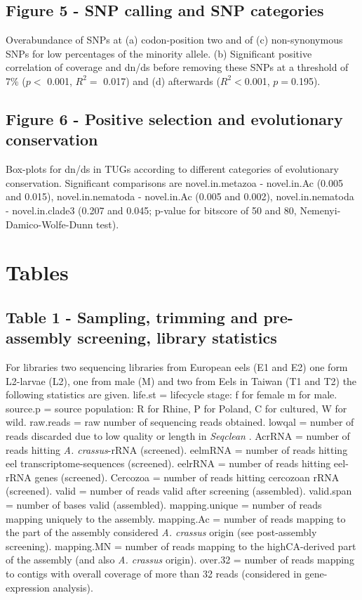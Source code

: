 \documentclass[10pt]{bmc_article}
\newenvironment{bmcformat}{\begin{raggedright}\baselineskip20pt\sloppy\setboolean{publ}{false}}{\end{raggedright}\baselineskip20pt\sloppy}
\begin{document}
\begin{bmcformat}
\subsection*{Figure 5 - SNP calling and SNP categories}
 
Overabundance of SNPs at (a) codon-position two and of (c)
non-synonymous SNPs for low percentages of the minority allele. (b)
Significant positive correlation of coverage and dn/ds before removing
these SNPs at a threshold of 7\% ($p<$ 0.001, $R^2=$
0.017) and (d) afterwards
($R^2<$0.001,
$p=$0.195).


\subsection*{Figure 6 - Positive selection and evolutionary
  conservation}

Box-plots for dn/ds in TUGs according to different categories of
evolutionary conservation. Significant comparisons are
novel.in.metazoa - novel.in.Ac (0.005 and 0.015), novel.in.nematoda -
novel.in.Ac (0.005 and 0.002), novel.in.nematoda - novel.in.clade3
(0.207 and 0.045; p-value for bitscore of 50 and 80,
Nemenyi-Damico-Wolfe-Dunn test).

\newpage

\section*{Tables}
\subsection*{Table 1 - Sampling, trimming and pre-assembly screening,
  library statistics}

For libraries two sequencing libraries from European eels (E1 and E2)
one form L2-larvae (L2), one from male (M) and two from Eels in Taiwan
(T1 and T2) the following statistics are given. life.st = lifecycle
stage: f for female m for male. source.p = source population: R for
Rhine, P for Poland, C for cultured, W for wild. raw.reads = raw
number of sequencing reads obtained. lowqal = number of reads
discarded due to low quality or length in \textit{Seqclean}
\cite{tgicl_pertea}. AcrRNA = number of reads hitting
\textit{A. crassus}-rRNA (screened). eelmRNA = number of reads hitting
eel transcriptome-sequences (screened). eelrRNA = number of reads
hitting eel-rRNA genes (screened). Cercozoa = number of reads hitting
cercozoan rRNA (screened). valid = number of reads valid after
screening (assembled). valid.span = number of bases valid (assembled).
mapping.unique = number of reads mapping uniquely to the
assembly. mapping.Ac = number of reads mapping to the part of the
assembly considered \textit{A. crassus} origin (see post-assembly
screening). mapping.MN = number of reads mapping to the highCA-derived
part of the assembly (and also \textit{A. crassus} origin). over.32 =
number of reads mapping to contigs with overall coverage of more than
32 reads (considered in gene-expression analysis).


\end{bmcformat}
\end{document}
